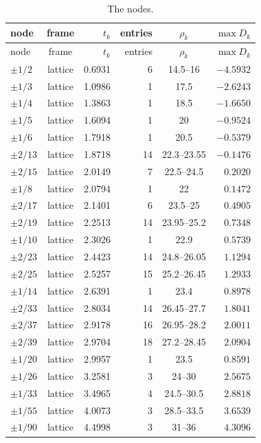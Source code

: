 \documentclass[11pt]{amsart}
\theoremstyle{definition}
\theoremstyle{remark}
\numberwithin{equation}{section}
\begin{document}
\begin{center}
\begin{longtable}{@{}lcrrcr@{}}
\caption{The nodes.}\label{tab:nodes}\\
\toprule
node & frame & $t_k$ & entries & $\rho_k$ & $\max D_k$\\
\midrule
\endfirsthead
\toprule
node & frame & $t_k$ & entries & $\rho_k$ & $\max D_k$\\
\midrule
\endhead
\bottomrule
\endfoot
$\pm1/2$ & lattice & 0.6931 & 6 & 14.5--16 & $-4.5932$ \\
$\pm1/3$ & lattice & 1.0986 & 1 & 17.5 & $-2.6243$ \\
$\pm1/4$ & lattice & 1.3863 & 1 & 18.5 & $-1.6650$ \\
$\pm1/5$ & lattice & 1.6094 & 1 & 20 & $-0.9524$ \\
$\pm1/6$ & lattice & 1.7918 & 1 & 20.5 & $-0.5379$ \\
$\pm2/13$ & lattice & 1.8718 & 14 & 22.3--23.55 & $-0.1476$ \\
$\pm2/15$ & lattice & 2.0149 & 7 & 22.5--24.5 & $0.2020$ \\
$\pm1/8$ & lattice & 2.0794 & 1 & 22 & $0.1472$ \\
$\pm2/17$ & lattice & 2.1401 & 6 & 23.5--25 & $0.4905$ \\
$\pm2/19$ & lattice & 2.2513 & 14 & 23.95--25.2 & $0.7348$ \\
$\pm1/10$ & lattice & 2.3026 & 1 & 22.9 & $0.5739$ \\
$\pm2/23$ & lattice & 2.4423 & 14 & 24.8--26.05 & $1.1294$ \\
$\pm2/25$ & lattice & 2.5257 & 15 & 25.2--26.45 & $1.2933$ \\
$\pm1/14$ & lattice & 2.6391 & 1 & 23.4 & $0.8978$ \\
$\pm2/33$ & lattice & 2.8034 & 14 & 26.45--27.7 & $1.8041$ \\
$\pm2/37$ & lattice & 2.9178 & 16 & 26.95--28.2 & $2.0011$ \\
$\pm2/39$ & lattice & 2.9704 & 18 & 27.2--28.45 & $2.0904$ \\
$\pm1/20$ & lattice & 2.9957 & 1 & 23.5 & $0.8591$ \\
$\pm1/26$ & lattice & 3.2581 & 3 & 24--30 & $2.5675$ \\
$\pm1/33$ & lattice & 3.4965 & 4 & 24.5--30.5 & $2.8818$ \\
$\pm1/55$ & lattice & 4.0073 & 3 & 28.5--33.5 & $3.6539$ \\
$\pm1/90$ & lattice & 4.4998 & 3 & 31--36 & $4.3096$ \\

\end{longtable}
\end{center}
\end{document}
